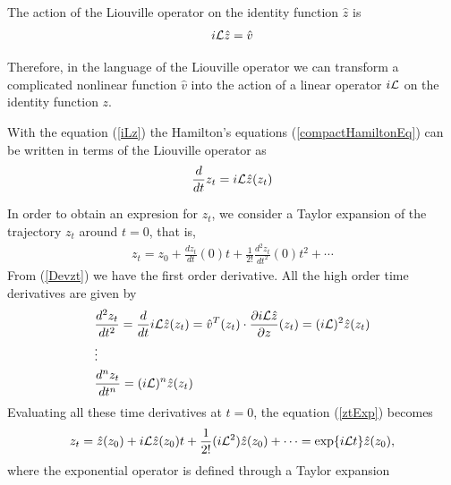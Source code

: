 \documentclass[b5paper,openright,10pt]{book}
\begin{document}

The action of the Liouville operator on the identity function $\hat{z}$ is
\begin{align}
  i{\cal L} \hat{z} = \hat{v}
  \label{iLz}
\end{align}

Therefore, in the language of the Liouville operator we can transform a complicated nonlinear function $\hat{v}$ into the action of a linear operator $i{\cal L}$ on the identity function $z$.

With the equation (\ref{iLz}) the Hamilton's equations (\ref{compactHamiltonEq}) can be written in terms of the Liouville operator as
\begin{align}
  \frac{d}{dt}z_t=i{\cal L}\hat{z}(z_t)
  \label{Devzt}
\end{align}

In order to obtain an expresion for $z_t$, we consider a Taylor expansion of the trajectory $z_t$ around $t=0$, that is,
\begin{align}
    z_t=z_0+\frac{dz_t}{dt}(0)t+\frac{1}{2!}\frac{d^2z_t}{dt^2}(0)t^2+\cdots
    \label{ztExp}
\end{align}
From (\ref{Devzt}) we have the first order derivative. All the high order time derivatives are given by
%
\begin{align}
    &\frac{d^2z_t}{dt^2} = \frac{d}{dt}i{\cal L}\hat{z}(z_t)
    =\hat{v}^T(z_t)\cdot\frac{\partial i{\cal L}\hat{z}}{\partial z}(z_t)
    =(i{\cal L})^2\hat{z}(z_t) \nonumber \\ 
    &\vdots \nonumber \\ 
    &\frac{d^n z_t}{dt^n} =(i{\cal L})^n\hat{z}(z_t)
\end{align}
%
Evaluating all these time derivatives at $t=0$, the equation (\ref{ztExp}) becomes
\begin{align}
    z_t=\hat{z}(z_0)+i{\cal L}\hat{z}(z_0)t
    +\frac{1}{2!}(i{\cal L}^2)\hat{z}(z_0)
    +\cdots
    ={\rm exp}\{i{\cal L}t\}\hat{z}(z_0),
    \label{zt1}
\end{align}
where the exponential operator is defined through a Taylor expansion
\end{document}
